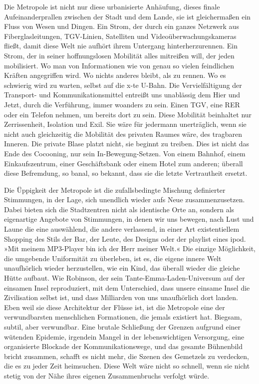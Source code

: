 \extrapar{}

Die Metropole ist nicht nur diese urbanisierte Anhäufung, dieses
finale Aufeinanderprallen zwischen der Stadt und dem Lande, sie ist
gleichermaßen ein Fluss von Wesen und Dingen. Ein Strom, der durch
ein ganzes Netzwerk aus Fiberglasleitungen, TGV-Linien, Satelliten
und Videoüberwachungskameras fließt, damit diese Welt nie aufhört
ihrem Untergang hinterherzurennen. Ein Strom, der in seiner
hoffnungslosen Mobilität alles mitreißen will, der jeden
mobilisiert. Wo man von Informationen wie von genau so vielen
feindlichen Kräften angegriffen wird. Wo nichts anderes bleibt, als
zu rennen. Wo es schwierig wird zu warten, selbst auf die x-te
U-Bahn.
Die Vervielfältigung der Transport- und Kommunikationsmittel
entreißt uns unablässig dem Hier und Jetzt, durch die Verführung,
immer woanders zu sein. Einen TGV, eine RER oder ein Telefon
nehmen, um bereits dort zu sein. Diese Mobilität beinhaltet nur
Zerrissenheit, Isolation und Exil. Sie wäre für jedermann
unerträglich, wenn sie nicht auch gleichzeitig die Mobilität des
privaten Raumes wäre, des tragbaren Inneren. Die private Blase
platzt nicht, sie beginnt zu treiben. Dies ist nicht das Ende des
Cocooning, nur sein In-Bewegung-Setzen. Von einem Bahnhof, einem
Einkaufszentrum, einer Geschäftsbank oder einem Hotel zum anderen;
überall diese Befremdung, so banal, so bekannt, dass sie die letzte
Vertrautheit ersetzt.

\extrapar{}

Die Üppigkeit der Metropole ist die zufallsbedingte Mischung
definierter Stimmungen, in der Lage, sich unendlich wieder aufs
Neue zusammenzusetzen. Dabei bieten sich die Stadtzentren nicht als
identische Orte an, sondern als eigenartige Angebote von
Stimmungen, in denen wir uns bewegen, nach Lust und Laune die eine
auswählend, die andere verlassend, in einer Art existentiellem
Shopping des Stils der Bar, der Leute, des Designs oder der
playlist eines ipod. »Mit meinem MP3-Player bin ich der Herr meiner
Welt.« Die einzige Möglichkeit, die umgebende Uniformität zu
überleben, ist es, die eigene innere Welt unaufhörlich wieder
herzustellen, wie ein Kind, das überall wieder die gleiche Hütte
aufbaut. Wie Robinson, der sein Tante-Emma-Laden-Universum auf der
einsamen Insel reproduziert, mit dem Unterschied, dass unsere
einsame Insel die Zivilisation selbst ist, und dass Milliarden von
uns unaufhörlich dort landen.
Eben weil sie diese Architektur der Flüsse ist, ist die Metropole
eine der verwundbarsten menschlichen Formationen, die jemals
existiert hat. Biegsam, subtil, aber verwundbar. Eine brutale
Schließung der Grenzen aufgrund einer wütenden Epidemie, irgendein
Mangel in der lebenswichtigen Versorgung, eine organisierte
Blockade der Kommunikationswege, und das gesamte Bühnenbild bricht
zusammen, schafft es nicht mehr, die Szenen des Gemetzels zu
verdecken, die es zu jeder Zeit heimsuchen. Diese Welt wäre nicht
so schnell, wenn sie nicht stetig von der Nähe ihres eigenen
Zusammenbruchs verfolgt würde.

